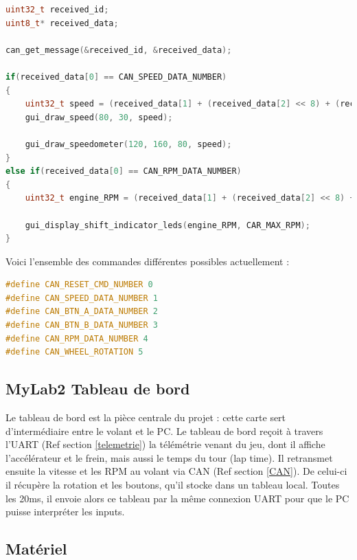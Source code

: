 \documentclass[french, 11pt]{article}
\begin{document}
\begin{lstlisting}[language=c, caption=Exemple de réception CAN en fonction du champ de commande]
uint32_t received_id;
uint8_t* received_data;

can_get_message(&received_id, &received_data);

if(received_data[0] == CAN_SPEED_DATA_NUMBER)
{
	uint32_t speed = (received_data[1] + (received_data[2] << 8) + (received_data[3] << 16) + (received_data[4] << 24));
	gui_draw_speed(80, 30, speed);

	gui_draw_speedometer(120, 160, 80, speed);
}
else if(received_data[0] == CAN_RPM_DATA_NUMBER)
{
	uint32_t engine_RPM = (received_data[1] + (received_data[2] << 8) + (received_data[3] << 16) + (received_data[4] << 24));

	gui_display_shift_indicator_leds(engine_RPM, CAR_MAX_RPM);
}
\end{lstlisting}


		Voici l'ensemble des commandes différentes possibles actuellement : 

\begin{lstlisting}[language=c, caption=Liste des commandes CAN disponibles]
#define CAN_RESET_CMD_NUMBER 0
#define CAN_SPEED_DATA_NUMBER 1
#define CAN_BTN_A_DATA_NUMBER 2
#define CAN_BTN_B_DATA_NUMBER 3
#define CAN_RPM_DATA_NUMBER 4
#define CAN_WHEEL_ROTATION 5
\end{lstlisting}

        
        \subsection{MyLab2 Tableau de bord}

        Le tableau de bord est la pièce centrale du projet : cette carte sert d'intermédiaire entre le volant et le PC. Le tableau de bord reçoit à travers l'UART (Ref section \ref{telemetrie}) la télémétrie venant du jeu, dont il affiche l'accélérateur et le frein, mais aussi le temps du tour (lap time). Il retransmet ensuite la vitesse et les RPM au volant via CAN (Ref section \ref{CAN}). De celui-ci il récupère la rotation et les boutons, qu'il stocke dans un tableau local. Toutes les 20ms, il envoie alors ce tableau par la même connexion UART pour que le PC puisse interpréter les inputs. 

        \subsection{Matériel}    
\end{document}
